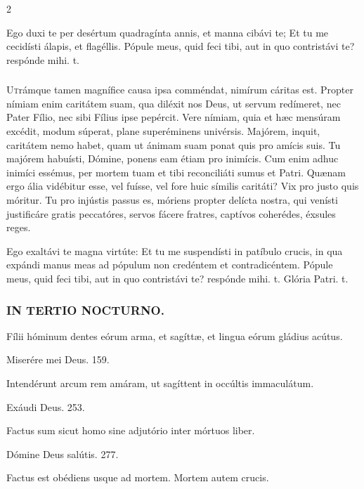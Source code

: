 \documentclass[9pt,twoside]{extarticle}
\begin{document}
\begin{multicols}{2}
\begin{tightlist}{}
\item {} Ego duxi te per desértum quadragínta annis, et manna cibávi te; \textred{*} Et tu me cecidísti álapis, et flagéllis.  Pópule meus, quid feci tibi, aut in quo contristávi te? respónde mihi. t.
\end{tightlist}

\subsubsection*{\center {}}
\lettrine{U}trámque tamen magnífice causa ipsa comméndat, nimírum cáritas est. Propter nímiam enim caritátem suam, qua diléxit nos Deus, ut servum redímeret, nec Pater Fílio, nec sibi Fílius ipse pepércit. Vere nímiam, quia et hæc mensúram excédit, modum súperat, plane superéminens univérsis. Majórem, inquit, caritátem nemo habet, quam ut ánimam suam ponat quis pro amícis suis. Tu majórem habuísti, Dómine, ponens eam étiam pro inimícis. Cum enim adhuc inimíci essémus, per mortem tuam et tibi reconciliáti sumus et Patri. Quænam ergo ália vidébitur esse, vel fuísse, vel fore huic símilis caritáti? Vix pro justo quis móritur. Tu pro injústis passus es, móriens propter delícta nostra, qui venísti justificáre gratis peccatóres, servos fácere fratres, captívos coherédes, éxsules reges.

\begin{tightlist}{}
\item {} Ego exaltávi te magna virtúte: \textred{*} Et tu me suspendísti in patíbulo crucis, in qua expándi manus meas ad pópulum non credéntem et contradicéntem.  Pópule meus, quid feci tibi, aut in quo contristávi te? respónde mihi. t. Glória Patri. t.
\end{tightlist}

\subsubsection*{\center \textsc{IN TERTIO NOCTURNO.}}
\begin{tightlist}{}
\item {} Fílii hóminum dentes eórum arma, et sagíttæ, et lingua eórum gládius acútus. 
\item {} Miserére mei Deus. 159.
\item {} Intendérunt arcum rem amáram, ut sagíttent in occúltis immaculátum.
\item {} Exáudi Deus. 253.
\item {} Factus sum sicut homo sine adjutório inter mórtuos liber.
\item {} Dómine Deus salútis. 277.
\item {} Factus est obédiens usque ad mortem.  Mortem autem crucis.
\end{tightlist}


\end{multicols}
\end{document}
